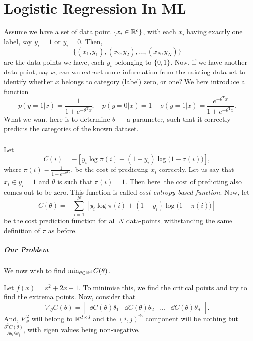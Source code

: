 \chapter{Logistic Regression In ML}
\myskip


Assume we have a set of data point $\{x_i\in \mathbb{R}^d\}$, with each $x_i$ having exactly one label, say $y_i = 1$ or $y_i = 0$. Then, 
$$\{(x_1, y_1), (x_2, y_2), \ldots, (x_N, y_N)\}$$
are the data points we have, each $y_i$ belonging to $\{0, 1\}$. Now, if we have another data point, say $x$, can we extract some information from the existing data set to identify whether $x$ belongs to category (label) zero, or one? We here introduce a function
$$p(y = 1 | x) = \frac{1}{1 + e^{-\theta^{\mathrm T}x}}; \quad p(y = 0|x) = 1 - p(y = 1|x) = \frac{e^{-\theta^{\mathrm T}x}}{1 + e^{-\theta^{\mathrm T}x}}.$$
What we want here is to determine $\theta$ --- a parameter, such that it correctly predicts the categories of the known dataset.

\paragraph{}
Let
$$C(i) = - \left[y_i \log\pi(i) + (1-y_i) \log\big(1-\pi(i)\big)\right],$$
where $\pi(i) = \frac{1}{1 + e^{-\theta^{\mathrm T}x}}$, be the cost of predicting $x_i$ correctly. Let us say that $x_i \in y_i = 1$ and $\theta$ is such that $\pi(i) = 1$. Then here, the cost of predicting also comes out to be zero. This function is called {\itshape cost-entropy based function}. Now, let
$$C(\theta) = -\sum_{i = 1}^N \left[y_i \log\pi(i) + (1-y_i) \log\big(1-\pi(i)\big)\right]$$
be the cost prediction function for all $N$ data-points, withstanding the same definition of $\pi$ as before.

\paragraph{Our Problem}
We now wish to find $\min_{\theta \in \mathbb{R}^d} C(\theta)$. 

\begin{example}
	Let $f(x) = x^2 + 2x+1$. To minimise this, we find the critical points and try to find the extrema points. Now, consider that
	$$\nabla_\theta C(\theta) = \begin{bmatrix} \dd{C(\theta)}{\theta_1} & \dd{C(\theta)}{\theta_2} & \dots & \dd{C(\theta)}{\theta_d} \end{bmatrix}.$$
	And, $\nabla_\theta^2$ will belong to $\mathbb{R}^{d \times d}$ and the $(i,j)^{\mathrm{th}}$ component will be nothing but $\frac{\partial^2 C(\theta)}{\partial\theta_i\partial\theta_j}$, with eigen values being non-negative.
\end{example}

